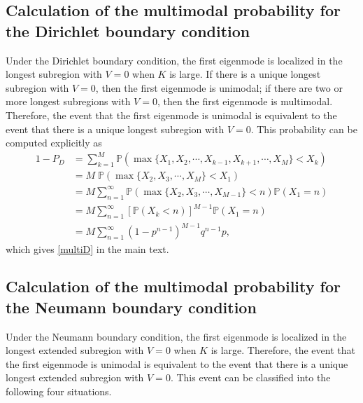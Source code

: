 \documentclass[a4paper,11pt]{article}
\begin{document}
\begin{appendices}
\subsection{Calculation of the multimodal probability for the Dirichlet boundary condition}\label{appB2}
Under the Dirichlet boundary condition, the first eigenmode is localized in the longest subregion with $V = 0$ when $K$ is large. If there is a unique longest subregion with $V = 0$, then the first eigenmode is unimodal; if there are two or more longest subregions with $V = 0$, then the first eigenmode is multimodal. Therefore, the event that the first eigenmode is unimodal is equivalent to the event that there is a unique longest subregion with $V = 0$. This probability can be computed explicitly as
\begin{equation*}
\begin{split}
1-P_D &= \sum_{k=1}^{M} \mathbb{P}(\max\{X_1, X_2, \cdots, X_{k-1}, X_{k+1}, \cdots, X_{M}\} < X_k) \\
&= M \; \mathbb{P}(\max\{X_{2}, X_{3}, \cdots, X_{M}\} < X_1) \\
&= M \sum_{n=1}^{\infty} \mathbb{P}(\max\{X_2, X_3, \cdots, X_{M-1}\} < n) \mathbb{P}(X_1 = n) \\
&= M \sum_{n=1}^{\infty} [\mathbb{P}(X_k < n)]^{M-1} \mathbb{P}(X_1 = n)\\
&= M \sum_{n=1}^{\infty} (1 - p^{n-1})^{M-1} q^{n-1} p,
\end{split}
\end{equation*}
which gives \eqref{multiD} in the main text.

\subsection{Calculation of the multimodal probability for the Neumann boundary condition}\label{appB3}
Under the Neumann boundary condition, the first eigenmode is localized in the longest extended subregion with $V = 0$ when $K$ is large. Therefore, the event that the first eigenmode is unimodal is equivalent to the event that there is a unique longest extended subregion with $V = 0$. This event can be classified into the following four situations.


\end{appendices}
\end{document}
